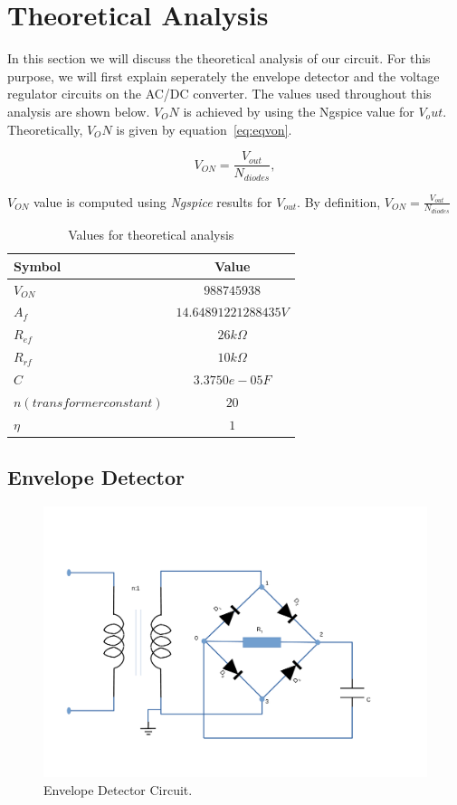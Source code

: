 \newpage
\section{Theoretical Analysis}
\label{sec:analysis}

In this section we will discuss the theoretical analysis of our circuit. For this purpose, we will first explain seperately the envelope detector and the voltage regulator circuits on the AC/DC converter. The values used throughout this analysis are shown below. $V_ON$ is achieved by using the Ngspice value for $V_out$. Theoretically, $V_ON$ is given by equation~\ref{eq:eqvon}.

\begin{equation}
  V_{ON} = \frac{V_{out}}{N_{diodes}},
  \label{eq:eqvon}
\end{equation}

$V_{ON}$ value is computed using \textit{Ngspice} results for $V_{out}$. By definition, $V_{ON}=\frac{V_{out}}{N_{diodes}}$
\begin{table}[h]
    \centering
    \begin{tabular}{|l|c|}
    \hline
    {\bf Symbol} & {\bf Value} \\ \hline
    $V_{ON}$ & $988745938$ \\ \hline
    $A_f$ & $14.64891221288435 V$ \\ \hline
    $R_{ef}$ & $26 k\Omega$  \\ \hline
    $R_{rf}$ & $10 k\Omega$\\ \hline
    $C$ & $3.3750e-05 F$ \\ \hline
    $n (transformer constant)$ & $20$  \\ \hline
    $\eta$ & $1$  \\ \hline
    \end{tabular}
    \caption{Values for theoretical analysis}
    \label{tab:values}
\end{table}


\subsection{Envelope Detector}
\label{sec:envelope}

\begin{figure}[!ht] \centering
\includegraphics[width=0.8\linewidth]{envelopedetector.pdf} 
\squeezeup 
\caption{Envelope Detector Circuit.}
\label{fig:envelope}
\end{figure}

